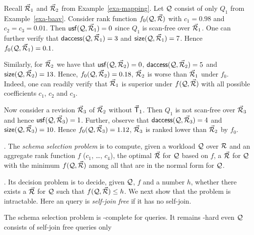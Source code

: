 \begin{example}\label{exa-measures}
Recall $\vec{{\mathcal R}}_{1}$ and $\vec{{\mathcal R}}_{2}$ from Example~\ref{exa-mapping}.
Let $\mathcal Q$ consist of only $Q_{1}$ from Example~\ref{exa-baav}.
Consider rank function $f_{0}(\mathcal Q, \vec{{\mathcal R}})$ with $c_{1} = 0.98$
and  $c_{2} = c_{3} = 0.01$.
%
Then ${\mathsf{usf}}(\mathcal Q, \allowbreak \vec{{\mathcal R}}_{1}) \allowbreak = \allowbreak 0$ since $Q_{1}$ is
scan-free over $\vec{{\mathcal R}}_{1}$.
One can further verify that
${\mathsf{daccess}}(\mathcal Q, \allowbreak \vec{{\mathcal R}}_{1}) \allowbreak = \allowbreak 3$ and
${\mathsf{size}}(\mathcal Q, \allowbreak \vec{{\mathcal R}}_{1}) \allowbreak = \allowbreak 7$.
Hence $f_{0}(\mathcal Q, \vec{{\mathcal R}}_{1}) = 0.1$.

\vspace{0.6ex}
Similarly, for $\vec{{\mathcal R}}_{2}$ we have that
${\mathsf{usf}}(\mathcal Q, \allowbreak \vec{{\mathcal R}}_{2})\allowbreak =\allowbreak 0$,
${\mathsf{daccess}}(\mathcal Q, \allowbreak \vec{{\mathcal R}}_{2}) \allowbreak = \allowbreak 5$ and
${\mathsf{size}}(\mathcal Q, \allowbreak \vec{{\mathcal R}}_{2}) \allowbreak = \allowbreak 13$.  Hence,
$f_{0}(\mathcal Q, \vec{{\mathcal R}}_{2}) = 0.18$, \ie $\vec{{\mathcal R}}_{2}$ is worse than
$\vec{{\mathcal R}}_{1}$ under $f_{0}$. Indeed, one can readily verify that
$\vec{{\mathcal R}}_{1}$ is superior under $f(\mathcal Q, \vec{{\mathcal R}})$ with all
possible coefficients $c_{1}$, $c_{2}$ and $c_{3}$.

\vspace{0.6ex}
Now consider a revision $\vec{{\mathcal R}}_{3}$ of $\vec{{\mathcal R}}_{2}$ without
$\vec{\protect\mathsf{T}}_{1}$. Then
$Q_{1}$ is not scan-free over $\vec{{\mathcal R}}_{3}$ and hence
${\mathsf{usf}}(\mathcal Q,\allowbreak \vec{{\mathcal R}}_{3}) = 1$. Further, observe that
${\mathsf{daccess}}(\mathcal Q, \allowbreak \vec{{\mathcal R}}_{3}) = 4$ and
${\mathsf{size}}(\mathcal Q, \allowbreak \vec{{\mathcal R}}_{3}) \allowbreak = \allowbreak 10$.
Hence $f_{0}(\mathcal Q,\allowbreak \vec{{\mathcal R}}_{3})\allowbreak =\allowbreak 1.12$,
\ie $\vec{{\mathcal R}}_{3}$ is ranked lower than $\vec{{\mathcal R}}_{2}$ by $f_{0}$.
\end{example}

\vspace{-0.4ex}




.
The {\em \baav schema selection problem} is to compute,
given a workload $\mathcal Q$ over ${\mathcal R}$ and an aggregate rank function
$f$ (\ie $c_{1}$, \ldots, $c_{4}$),
the optimal \bds $\vec{{\mathcal R}}$ for $\mathcal Q$ based on $f$, \ie a \bds
$\vec{{\mathcal R}}$ for $\mathcal Q$ with the minimum $f(\mathcal Q, \vec{{\mathcal R}})$ among all \bdss
that are in the normal form for $\mathcal Q$.


. Its  decision problem is to decide, given $\mathcal Q$, $f$ and a
number $h$, whether there exists a \bds $\vec{{\mathcal R}}$ for
$\mathcal Q$ such that $f(\mathcal Q, \vec{{\mathcal R}})\leq h$.
We next show that the problem is intractable.
  Here an \SPC query 
  is {\em self-join free} if it has no self-join.


\begin{theorem}\label{thm-complexity}
  The \baav schema selection problem
  is \NP-complete for \warn{\SQL} %
  queries. 
It remains \NP-hard even $\mathcal Q$ consists of self-join free
\SPC queries only 
\end{theorem}

